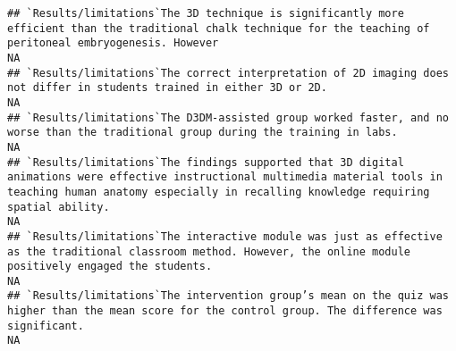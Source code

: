 \documentclass[]{article}
\begin{document}
\begin{verbatim}
## `Results/limitations`The 3D technique is significantly more efficient than the traditional chalk technique for the teaching of peritoneal embryogenesis. However                                                                                                                                                                                                                                                                                                                     NA
## `Results/limitations`The correct interpretation of 2D imaging does not differ in students trained in either 3D or 2D.                                                                                                                                                                                                                                                                                                                                                                NA
## `Results/limitations`The D3DM-assisted group worked faster, and no worse than the traditional group during the training in labs.                                                                                                                                                                                                                                                                                                                                                     NA
## `Results/limitations`The findings supported that 3D digital animations were effective instructional multimedia material tools in teaching human anatomy especially in recalling knowledge requiring spatial ability.                                                                                                                                                                                                                                                                 NA
## `Results/limitations`The interactive module was just as effective as the traditional classroom method. However, the online module positively engaged the students.                                                                                                                                                                                                                                                                                                                   NA
## `Results/limitations`The intervention group’s mean on the quiz was higher than the mean score for the control group. The difference was significant.                                                                                                                                                                                                                                                                                                                                 NA

\end{verbatim}
\end{document}
